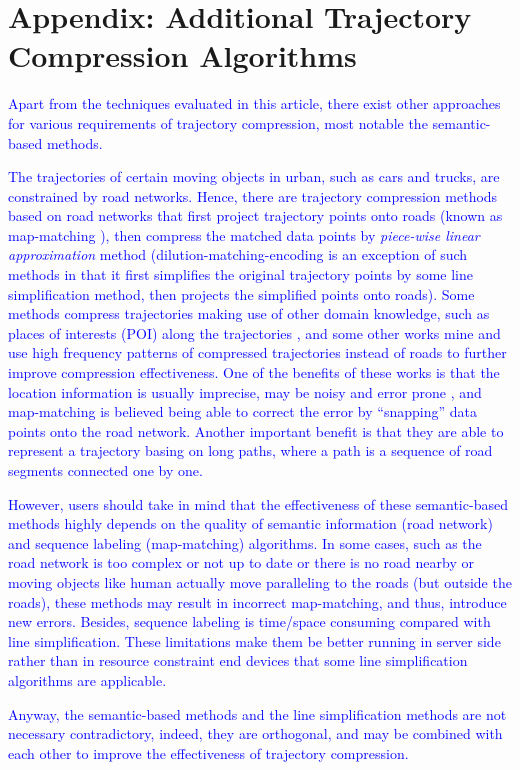 \section*{{Appendix: Additional Trajectory Compression Algorithms}}
\textcolor{blue}{Apart from the techniques evaluated in this article, there exist other approaches for various requirements of trajectory compression, most notable the semantic-based methods.}

\textcolor{blue}{The trajectories of certain moving objects in urban, such as cars and trucks, are constrained by road networks. Hence, there are trajectory compression methods based on road networks \cite{Chen:Trajectory, Popa:Spatio,Civilis:Techniques,Hung:Clustering, Kellaris:Map, Song:PRESS, Han:Compress, Cao:Road} that first project trajectory points onto roads (known as map-matching \cite{Quddus:MapMatching}), then compress the matched data points by \emph{piece-wise linear approximation} method \cite{Elmeleegy:Stream, Xie:Stream,Luo:Streaming,ORourke:Fitting} (dilution-matching-encoding \cite{Gotsman:Compaction} is an exception of such methods in that it first simplifies the original trajectory points by some line simplification method, then projects the simplified points onto roads).}
%
\textcolor{blue}{Some methods \cite{Schmid:Semantic, Richter:Semantic} compress trajectories making use of other domain knowledge, such as places of interests (POI) along the trajectories \cite{Richter:Semantic}, and some other works \cite{Gotsman:Compaction, Song:PRESS, Han:Compress,Koide:CiNCT} mine and use high frequency patterns of compressed trajectories instead of roads to further improve compression effectiveness.}
%
\textcolor{blue}{One of the benefits of these works is that the location information is usually imprecise, may be noisy and error prone \cite{Cao:Road}, and map-matching is believed being able to correct the error by “snapping” data points onto the road network.
Another important benefit is that they are able to represent a trajectory basing on long paths, where a path is a sequence of road segments connected one by one.}

\textcolor{blue}{However, users should take in mind that the effectiveness of these semantic-based methods highly depends on the quality of semantic information (\eg road network) and sequence labeling (\eg map-matching) algorithms. In some cases, such as the road network is too complex or not up to date or there is no road nearby or moving objects like human actually move paralleling to the roads (but outside the roads), these methods may result in incorrect map-matching, and thus, introduce new errors.}
\textcolor{blue}{Besides, sequence labeling is time/space consuming compared with line simplification. These limitations make them be better running in server side rather than in resource constraint end devices that some line simplification algorithms are applicable.}

\textcolor{blue}{Anyway, the semantic-based methods and the line simplification methods are not necessary contradictory, indeed, they are orthogonal, and may be combined with each other to improve the effectiveness of trajectory compression.}



